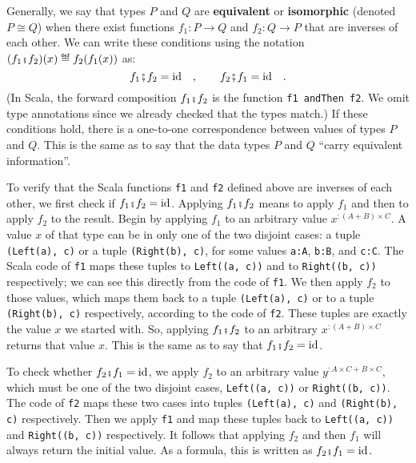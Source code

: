 Generally, we say that types $P$ and $Q$ are \textbf{equivalent}
or \textbf{isomorphic} (denoted $P\cong Q$) when
there exist functions $f_{1}:P\rightarrow Q$ and $f_{2}:Q\rightarrow P$
that are inverses of each other. We can write these conditions using
the notation $(f_{1}\bef f_{2})(x)\triangleq f_{2}(f_{1}(x))$ as:
\[
f_{1}\bef f_{2}=\text{id}\quad,\quad\quad f_{2}\bef f_{1}=\text{id}\quad.
\]
(In Scala, the forward composition $f_{1}\bef f_{2}$ is the function
\lstinline!f1 andThen f2!. We omit type annotations since we already
checked that the types match.) If these conditions hold, there is
a one-to-one correspondence between values of types $P$ and $Q$.
This is the same as to say that the data types $P$ and $Q$ \textsf{``}carry
equivalent information\textsf{''}.

To verify that the Scala functions \lstinline!f1! and \lstinline!f2!
defined above are inverses of each other, we first check if $f_{1}\bef f_{2}=\text{id}$.
Applying $f_{1}\bef f_{2}$ means to apply $f_{1}$ and then to apply
$f_{2}$ to the result. Begin by applying $f_{1}$ to an arbitrary
value $x^{:(A+B)\times C}$. A value $x$ of that type can be in only
one of the two disjoint cases: a tuple \lstinline!(Left(a), c)! or
a tuple \lstinline!(Right(b), c)!, for some values \lstinline!a:A!,
\lstinline!b:B!, and \lstinline!c:C!. The Scala code of \lstinline!f1!
maps these tuples to \lstinline!Left((a, c))! and to \lstinline!Right((b, c))!
respectively; we can see this directly from the code of \lstinline!f1!.
We then apply $f_{2}$ to those values, which maps them back to a
tuple \lstinline!(Left(a), c)! or to a tuple \lstinline!(Right(b), c)!
respectively, according to the code of \lstinline!f2!. These tuples
are exactly the value $x$ we started with. So, applying $f_{1}\bef f_{2}$
to an arbitrary $x^{:(A+B)\times C}$ returns that value $x$. This
is the same as to say that $f_{1}\bef f_{2}=\text{id}$.

To check whether $f_{2}\bef f_{1}=\text{id}$, we apply $f_{2}$ to
an arbitrary value $y^{:A\times C+B\times C}$, which must be one
of the two disjoint cases, \lstinline!Left((a, c))! or \lstinline!Right((b, c))!.
The code of \lstinline!f2! maps these two cases into tuples \lstinline!(Left(a), c)!
and \lstinline!(Right(b), c)! respectively. Then we apply \lstinline!f1!
and map these tuples back to \lstinline!Left((a, c))! and \lstinline!Right((b, c))!
respectively. It follows that applying $f_{2}$ and then $f_{1}$
will always return the initial value. As a formula, this is written
as $f_{2}\bef f_{1}=\text{id}$.

